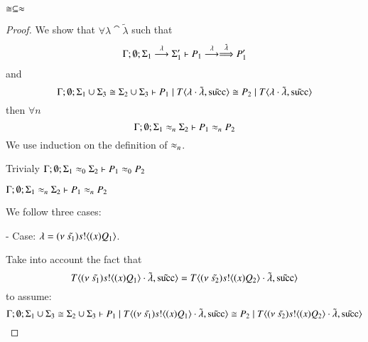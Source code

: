 \begin{lemma}\rm
	\label{lem:cong_is_wb}
	$\cong \subseteq \approx$
\end{lemma}

\begin{proof}

	\noi We show that
	$\forall \lambda \cat \tilde{\lambda}$
	such that
	\begin{eqnarray}
		\Gamma; \emptyset; \Sigma_1 \stackrel{\lambda}{\longrightarrow} \Sigma_1' \vdash P_1 \stackrel{\lambda}{\longrightarrow} \stackrel{\tilde{\lambda}}{\Longrightarrow} P_1' \label{lem:cong_is_wb1}
	\end{eqnarray}
	\noi and 
	\[
		\Gamma; \emptyset; \Sigma_1 \cup \Sigma_3 \cong \Sigma_2 \cup \Sigma_3 \vdash P_1 \;|\; T\langle \lambda \cdot \tilde{\lambda}, \tilde{\textrm{succ}} \rangle \cong P_2 \;|\; T\langle \lambda \cdot \tilde{\lambda}, \tilde{\textrm{succ}} \rangle
	\]
	\noi then $\forall n$
	\[
		\Gamma; \emptyset; \Sigma_1 \approx_n \Sigma_2 \vdash P_1 \approx_n P_2
	\]
%
	\noi We use induction on the definition of $\approx_n$.

	 Trivialy $\Gamma; \emptyset; \Sigma_1 \approx_0 \Sigma_2 \vdash P_1 \approx_0 P_2$

	 $\Gamma; \emptyset; \Sigma_1 \approx_n \Sigma_2 \vdash P_1 \approx_n P_2$


	\noi We follow three cases:

	\noi - Case: $\lambda = (\nu\ \tilde{s_1}) s ! \langle (x)Q_1 \rangle$.

	\noi Take into account the fact that
%
	\[
		T\langle (\nu\ \tilde{s_1}) s ! \langle (x)Q_1 \rangle \cdot \tilde{\lambda}, \tilde{\textrm{succ}} \rangle = T\langle (\nu\ \tilde{s_2}) s ! \langle (x)Q_2 \rangle \cdot \tilde{\lambda}, \tilde{\textrm{succ}} \rangle
	\]
%
	\noi to assume:
%
	\[
		\Gamma; \emptyset; \Sigma_1 \cup \Sigma_3 \cong \Sigma_2 \cup \Sigma_3  \vdash P_1 \;|\; T\langle (\nu\ \tilde{s_1}) s ! \langle (x)Q_1 \rangle \cdot \tilde{\lambda}, \tilde{\textrm{succ}} \rangle \cong P_2 \;|\; T\langle (\nu\ \tilde{s_2}) s ! \langle (x)Q_2 \rangle \cdot \tilde{\lambda}, \tilde{\textrm{succ}} \rangle
	\]


\end{proof}
